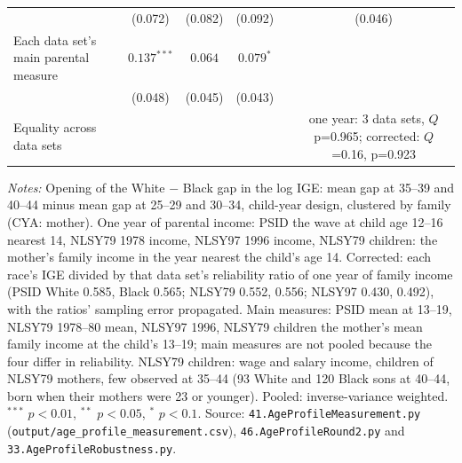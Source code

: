 \begin{table}[!htbp]
{{\begin{tabular}{lccccc}
 & (0.072) & (0.082) & (0.092) &  & (0.046) \\
Each data set's main parental measure & $0.137^{***}$ & $0.064$ & $0.079^{*}$ &  &  \\
 & (0.048) & (0.045) & (0.043) &  &  \\
Equality across data sets &  &  &  &  & one year: 3 data sets, $Q$ p=0.965; corrected: $Q$=0.16, p=0.923 \\
\bottomrule
\end{tabular}}}
\par\smallskip
\begin{minipage}{\textwidth}\footnotesize \textit{Notes:} Opening of the White $-$ Black gap in the log IGE: mean gap at 35--39 and 40--44 minus mean gap at 25--29 and 30--34, child-year design, clustered by family (CYA: mother). One year of parental income: PSID the wave at child age 12--16 nearest 14, NLSY79 1978 income, NLSY97 1996 income, NLSY79 children: the mother's family income in the year nearest the child's age 14. Corrected: each race's IGE divided by that data set's reliability ratio of one year of family income (PSID White 0.585, Black 0.565; NLSY79 0.552, 0.556; NLSY97 0.430, 0.492), with the ratios' sampling error propagated. Main measures: PSID mean at 13--19, NLSY79 1978--80 mean, NLSY97 1996, NLSY79 children the mother's mean family income at the child's 13--19; main measures are not pooled because the four differ in reliability. NLSY79 children: wage and salary income, children of NLSY79 mothers, few observed at 35--44 (93 White and 120 Black sons at 40--44, born when their mothers were 23 or younger). Pooled: inverse-variance weighted. $^{***}$ $p<0.01$, $^{**}$ $p<0.05$, $^{*}$ $p<0.1$. Source: \texttt{41.AgeProfileMeasurement.py} (\texttt{output/age\_profile\_measurement.csv}), \texttt{46.AgeProfileRound2.py} and \texttt{33.AgeProfileRobustness.py}.\end{minipage}
\end{table}
